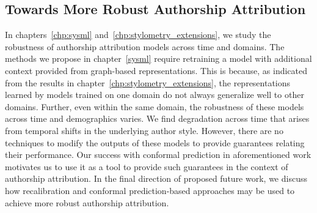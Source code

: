 \subsection{Towards More Robust Authorship Attribution}
In chapters~\ref{chp:sysml} and~\ref{chp:stylometry_extensions}, we study the robustness of authorship attribution models across time and domains.
The methods we propose in chapter~\ref{sysml} require retraining a model with additional context provided from graph-based representations.
This is because, as indicated from the results in chapter~\ref{chp:stylometry_extensions}, the representations learned by models trained on one domain do not always generalize well to other domains.
Further, even within the same domain, the robustness of these models across time and demographics varies.
We find degradation across time that arises from temporal shifts in the underlying author style.
However, there are no techniques to modify the outputs of these models to provide guarantees relating their performance.
Our success with conformal prediction in aforementioned work motivates us to use it as a tool to provide such guarantees in the context of authorship attribution.
In the final direction of proposed future work, we discuss how recalibration and conformal prediction-based approaches may be used to achieve more robust authorship attribution.


